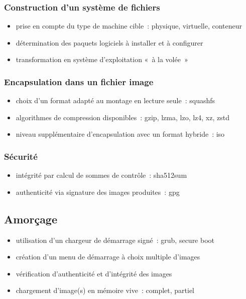 \documentclass[10pt]{article}
\newenvironment{itmz}{\begin{itemize}
\setlength{\itemsep}{0em}
}{\end{itemize}}
\begin{document}
\subsubsection{Construction d’un système de fichiers}

\begin{itmz}
\item{prise en compte du type de machine cible : physique, virtuelle, conteneur}
\item{détermination des paquets logiciels à installer et à configurer}
\item{transformation en système d’exploitation « à la volée »}
\end{itmz}

\subsubsection{Encapsulation dans un fichier image}

\begin{itmz}
\item{choix d’un format adapté au montage en lecture seule : squashfs}
\item{algorithmes de compression disponibles : gzip, lzma, lzo, lz4, xz, zstd}
\item{niveau supplémentaire d’encapsulation avec un format hybride : iso}
\end{itmz}

\subsubsection{Sécurité}

\begin{itmz}
\item{intégrité par calcul de sommes de contrôle : sha512sum}
\item{authenticité via signature des images produites : gpg}
\end{itmz}

\subsection{Amorçage}

\begin{itmz}
\item{utilisation d’un chargeur de démarrage signé : grub, secure boot}
\item{création d’un menu de démarrage à choix multiple d’images}
\item{vérification d’authenticité et d’intégrité des images}
\item{chargement d’image(s) en mémoire vive : complet, partiel}
\end{itmz}
\end{document}
